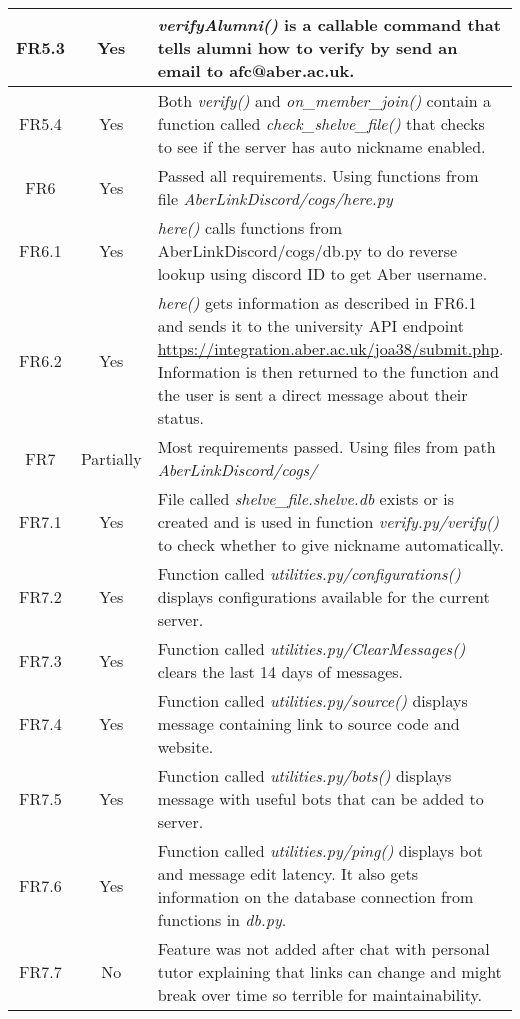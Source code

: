 \begin{longtable}{| c | c | p{10cm} |}
\hline
FR5.3 & \color{ForestGreen}Yes & \textit{verifyAlumni()} is a callable command that tells alumni how to verify by send an email to afc@aber.ac.uk.\\
\hline
FR5.4 & \color{ForestGreen}Yes & Both \textit{verify()} and \textit{on\_member\_join()} contain a function called \textit{check\_shelve\_file()} that checks to see if the server has auto nickname enabled.\\
\hline
FR6 & \color{ForestGreen}Yes & Passed all requirements. Using functions from file \textit{AberLinkDiscord/cogs/here.py}\\
\hline
FR6.1 & \color{ForestGreen}Yes & \textit{here()} calls functions from AberLinkDiscord/cogs/db.py to do reverse lookup using discord ID to get Aber username.\\
\hline
FR6.2 & \color{ForestGreen}Yes & \textit{here()} gets information as described in FR6.1 and sends it to the university API endpoint \url{https://integration.aber.ac.uk/joa38/submit.php}. Information is then returned to the function and the user is sent a direct message about their status.\\
\hline
FR7 & \color{orange}Partially & Most requirements passed. Using files from path \textit{AberLinkDiscord/cogs/}\\
\hline
FR7.1 & \color{ForestGreen}Yes & File called \textit{shelve\_file.shelve.db} exists or is created and is used in function \textit{verify.py/verify()} to check whether to give nickname automatically.\\
\hline
FR7.2 & \color{ForestGreen}Yes & Function called \textit{utilities.py/configurations()} displays configurations available for the current server.\\
\hline
FR7.3 & \color{ForestGreen}Yes & Function called \textit{utilities.py/ClearMessages()} clears the last 14 days of messages.\\
\hline
FR7.4 & \color{ForestGreen}Yes & Function called \textit{utilities.py/source()} displays message containing link to source code and website.\\
\hline
FR7.5 & \color{ForestGreen}Yes & Function called \textit{utilities.py/bots()} displays message with useful bots that can be added to server.\\
\hline
FR7.6 & \color{ForestGreen}Yes & Function called \textit{utilities.py/ping()} displays bot and message edit latency. It also gets information on the database connection from functions in \textit{db.py}.\\
\hline
FR7.7 & \color{red}No & Feature was not added after chat with personal tutor explaining that links can change and might break over time so terrible for maintainability.\\

\end{longtable}

